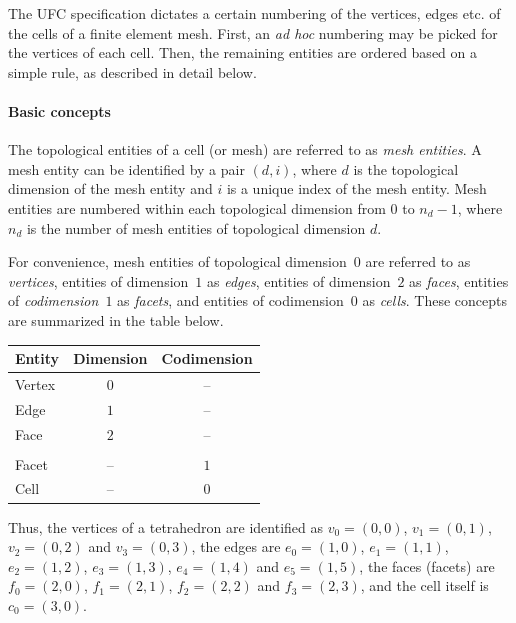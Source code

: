 %


The UFC specification dictates a certain numbering of the vertices,
edges etc. of the cells of a finite element mesh. First, an \emph{ad
hoc} numbering may be picked for the vertices of each cell. Then, the
remaining entities are ordered based on a simple rule, as described in
detail below.

\paragraph{Basic concepts}

The topological entities of a cell (or mesh) are referred to as
\emph{mesh entities}. A mesh entity can be identified by a pair $(d,
i)$, where $d$ is the topological dimension of the mesh entity and $i$
is a unique index of the mesh entity. Mesh entities are numbered
within each topological dimension from $0$ to $n_d-1$, where $n_d$ is
the number of mesh entities of topological dimension $d$.

For convenience, mesh entities of topological dimension~$0$ are
referred to as \emph{vertices}, entities of dimension~$1$ as
\emph{edges}, entities of dimension~$2$ as \emph{faces}, entities of
\emph{codimension}~$1$ as \emph{facets}, and entities of codimension~$0$
as \emph{cells}. These concepts are summarized in the table below.

\vspace{0.5cm}
\begin{center}
  \begin{tabular}{lcc} \toprule Entity & Dimension &
    Codimension \\ \hline Vertex & $0$ & -- \\ Edge & $1$ & -- \\ Face
    & $2$ & -- \\ & & \\ Facet & -- & $1$ \\ Cell & -- &
    $0$ \\ \bottomrule \end{tabular}
\end{center}
\vspace{0.5cm}

Thus, the vertices of a tetrahedron are identified as $v_0 = (0, 0)$,
$v_1 = (0, 1)$, $v_2 = (0, 2)$ and $v_3 = (0, 3)$, the edges are $e_0
= (1, 0)$, $e_1 = (1, 1)$, $e_2 = (1, 2)$, $e_3 = (1, 3)$, $e_4 = (1,
4)$ and $e_5 = (1, 5)$, the faces (facets) are $f_0 = (2, 0)$, $f_1 =
(2, 1)$, $f_2 = (2, 2)$ and $f_3 = (2, 3)$, and the cell itself is
$c_0 = (3, 0)$.

